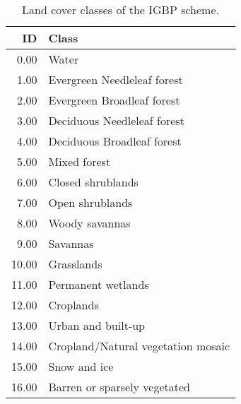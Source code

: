 \begin{table}[H]
\centering
\caption[Land cover classes of the IGBP scheme]{Land cover classes of the IGBP scheme.} 
\label{table:mlc_classes}
\begin{tabular}{rl}
  \toprule
ID & Class \\ 
  \midrule
0.00 & Water \\ 
  1.00 & Evergreen Needleleaf forest \\ 
  2.00 & Evergreen Broadleaf forest \\ 
  3.00 & Deciduous Needleleaf forest \\ 
  4.00 & Deciduous Broadleaf forest \\ 
  5.00 & Mixed forest \\ 
  6.00 & Closed shrublands \\ 
  7.00 & Open shrublands \\ 
  8.00 & Woody savannas \\ 
  9.00 & Savannas \\ 
  10.00 & Grasslands \\ 
  11.00 & Permanent wetlands \\ 
  12.00 & Croplands \\ 
  13.00 & Urban and built-up \\ 
  14.00 & Cropland/Natural vegetation mosaic \\ 
  15.00 & Snow and ice \\ 
  16.00 & Barren or sparsely vegetated \\ 
   \bottomrule
\end{tabular}
\end{table}
